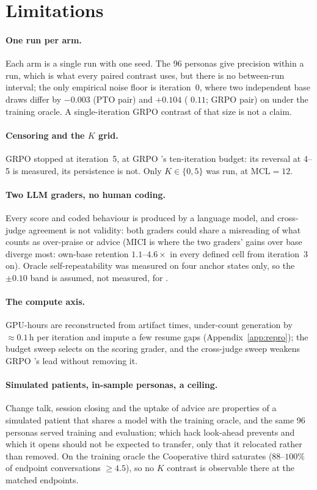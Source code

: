\section*{Limitations}
\label{sec:limitations}

\paragraph{One run per arm.} Each arm is a single run with one seed. The 96 personas give
precision within a run, which is what every paired contrast uses, but there is no between-run
interval; the only empirical noise floor is iteration~0, where two independent base draws differ
by $-0.003$ (PTO pair) and $+0.104$ (\dz{} $0.11$; GRPO pair) on \QQ{} under the training oracle.
A single-iteration GRPO contrast of that size is not a claim.

\paragraph{Censoring and the $K$ grid.} GRPO \Kf{} stopped at iteration~5, at GRPO \Kz{}'s
ten-iteration budget: its reversal at 4--5 is measured, its persistence is not. Only
$K \in \{0, 5\}$ was run, at $\mathrm{MCL}{=}12$.

\paragraph{Two LLM graders, no human coding.} Every score and coded behaviour is produced by a
language model, and cross-judge agreement is not validity: both graders could share a
misreading of what counts as over-praise or advice (MICI is where the two graders' gains over
base diverge most: own-base retention $1.1$--$4.6\times$ in every defined cell from
iteration~3 on). Oracle self-repeatability was measured on four \Kz{} anchor states only, so
the $\pm 0.10$ band is assumed, not measured, for \Kf{}.

\paragraph{The compute axis.} GPU-hours are reconstructed from artifact times, under-count
generation by ${\approx}0.1$\,h per iteration and impute a few resume gaps
(Appendix~\ref{app:repro}); the budget sweep selects on the scoring grader, and the cross-judge
sweep weakens GRPO \Kf{}'s lead without removing it.

\paragraph{Simulated patients, in-sample personas, a ceiling.} Change talk, session closing and
the uptake of advice are properties of a simulated patient that shares a model with the training
oracle, and the same 96 personas served training and evaluation; which hack look-ahead prevents
and which it opens should not be expected to transfer, only that it relocated rather than
removed. On the training oracle the Cooperative third saturates \QQ{} ($88$--$100\%$ of endpoint
conversations $\geq 4.5$), so no $K$ contrast is observable there at the matched endpoints.
